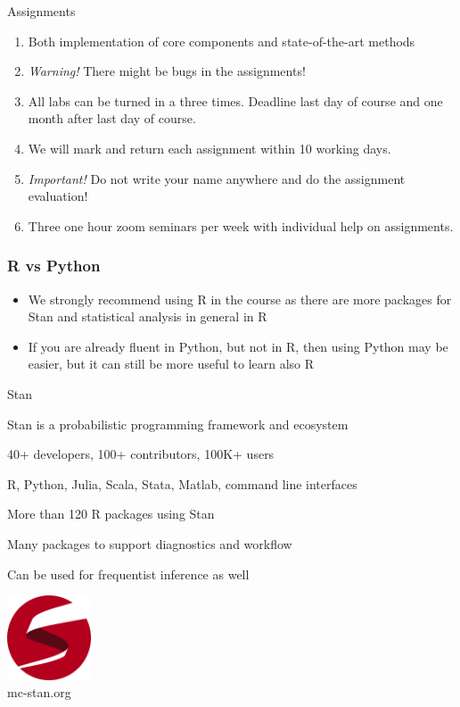 \documentclass[10pt,handout]{beamer}
\begin{document}
\begin{frame}{Assignments}

\begin{enumerate}
\item Both implementation of core components and state-of-the-art methods\pause
\item \emph{Warning!} There might be bugs in the assignments!\pause
\item All labs can be turned in a three times. Deadline last day of course and one month after last day of course.
\item We will mark and return each assignment within 10 working days.
\item \emph{Important!} Do not write your name anywhere and do the assignment evaluation!
\item Three one hour zoom seminars per week with individual help on assignments.
\end{enumerate}

\end{frame}


\begin{frame}
  \frametitle{R vs Python}

  \begin{itemize}
  \item We strongly recommend using R in the course as there are more
    packages for Stan and statistical analysis in general in R
  \item If you are already fluent in Python, but not in R, then using Python
    may be easier, but it can still be more useful to learn also R
  \end{itemize}

\end{frame}



\begin{frame}{Stan}

  Stan is a probabilistic programming framework and ecosystem

  40+ developers, 100+ contributors, 100K+ users

  R, Python, Julia, Scala, Stata, Matlab, command line interfaces

  More than 120 R packages using Stan

  Many packages to support diagnostics and workflow

  Can be used for frequentist inference as well

  \center
  \vspace{\baselineskip}
  \includegraphics[width=2.5cm]{figs/stan_logo_wide.png}\\
  mc-stan.org

\end{frame}
\end{document}
